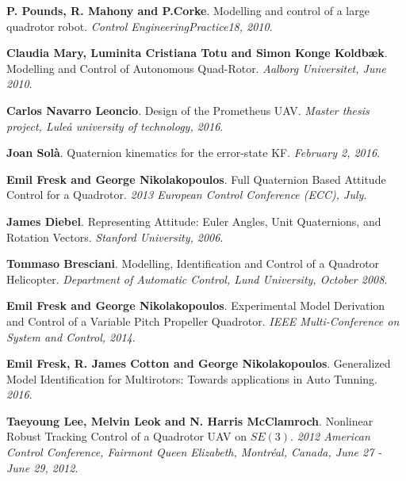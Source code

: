 \documentclass[11pt, a4paper, onecolumn, fleqn, twoside, titlepage, openright]{book}
\begin{document}
	\begin{thebibliography}{1}
	\label{bibliography}

		\textbf{P. Pounds, R. Mahony and P.Corke}.
		Modelling and control of a large quadrotor robot.
		\textit{Control EngineeringPractice18, 2010}.

		\textbf{Claudia Mary, Luminita Cristiana Totu and Simon Konge Koldbæk}.
		Modelling and Control of Autonomous Quad-Rotor.	
		\textit{Aalborg Universitet, June 2010}.

		\textbf{Carlos Navarro Leoncio}.
		Design of the Prometheus UAV.
		\textit{Master thesis project, Lule\r{a} university of technology, 2016}.

		\textbf{Joan Solà}.
		Quaternion kinematics for the error-state KF.
		\textit{February 2, 2016}.

		\textbf{Emil Fresk and George Nikolakopoulos}.
		Full Quaternion Based Attitude Control for a Quadrotor.
		\textit{2013 European Control Conference (ECC), July}.

		\textbf{James Diebel}.
		Representing Attitude: Euler Angles, Unit Quaternions, and Rotation Vectors.
		\textit{Stanford University, 2006}.

		\textbf{Tommaso Bresciani}.
		Modelling, Identification and Control of a Quadrotor Helicopter.
		\textit{Department of Automatic Control, Lund University, October 2008}.

		\textbf{Emil Fresk and George Nikolakopoulos}.
		Experimental Model Derivation and Control of a Variable Pitch Propeller Quadrotor.
		\textit{IEEE Multi-Conference on System and Control, 2014}.

		\textbf{Emil Fresk, R. James Cotton and George Nikolakopoulos}.
		Generalized Model Identification for Multirotors: Towards applications in Auto Tunning.
		\textit{2016}.		



		\textbf{Taeyoung Lee, Melvin Leok and N. Harris McClamroch}.
		Nonlinear Robust Tracking Control of a Quadrotor UAV on $SE(3)$.
		\textit{2012 American Control Conference, Fairmont Queen Elizabeth, Montréal, Canada, June 27 - June 29, 2012}.		

	\end{thebibliography}
\end{document}
